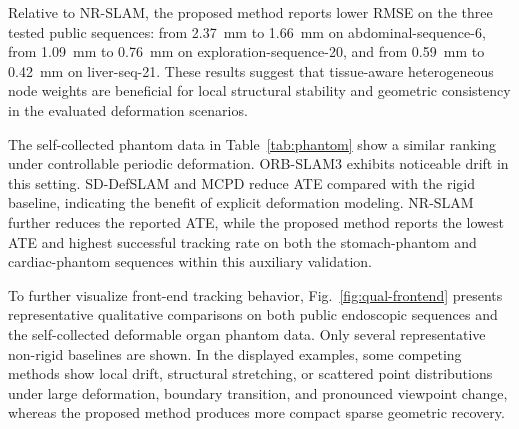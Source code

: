 \documentclass[pdflatex,sn-mathphys-num]{sn-jnl}
\begin{document}
Relative to NR-SLAM, the proposed method reports lower RMSE on the three tested public sequences: from 2.37~mm to 1.66~mm on abdominal-sequence-6, from 1.09~mm to 0.76~mm on exploration-sequence-20, and from 0.59~mm to 0.42~mm on liver-seq-21. These results suggest that tissue-aware heterogeneous node weights are beneficial for local structural stability and geometric consistency in the evaluated deformation scenarios.

\begin{table}[t]
\caption{Auxiliary quantitative validation on the self-collected deformable organ phantom dataset.}
\label{tab:phantom}
\centering
\small
{}
\end{table}

The self-collected phantom data in Table~\ref{tab:phantom} show a similar ranking under controllable periodic deformation. ORB-SLAM3 exhibits noticeable drift in this setting. SD-DefSLAM and MCPD reduce ATE compared with the rigid baseline, indicating the benefit of explicit deformation modeling. NR-SLAM further reduces the reported ATE, while the proposed method reports the lowest ATE and highest successful tracking rate on both the stomach-phantom and cardiac-phantom sequences within this auxiliary validation.

To further visualize front-end tracking behavior, Fig.~\ref{fig:qual-frontend} presents representative qualitative comparisons on both public endoscopic sequences and the self-collected deformable organ phantom data. Only several representative non-rigid baselines are shown. In the displayed examples, some competing methods show local drift, structural stretching, or scattered point distributions under large deformation, boundary transition, and pronounced viewpoint change, whereas the proposed method produces more compact sparse geometric recovery.
\end{document}
